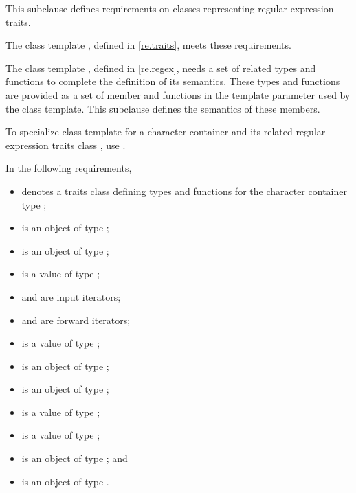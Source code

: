 \pnum
This subclause defines requirements on classes representing regular
expression traits.
\begin{note}
The class template
, defined in \ref{re.traits},
meets these requirements.
\end{note}

\pnum
The class template , defined in
\ref{re.regex}, needs a set of related types and
functions to complete the definition of its semantics. These types
and functions are provided as a set of member  and functions
in the template parameter  used by the  class
template. This subclause defines the semantics of these
members.

\pnum
To specialize class template  for a character
container  and its related regular
expression traits class , use .

\pnum
{}%
%
%
%
In the following requirements,
\begin{itemize}
\item
{} denotes a traits class defining types and functions
for the character container type ;
\item
{} is an object of type ;
\item
{} is an object of type ;
\item
{} is a value of type ;
\item
{} and  are input iterators;
\item
{} and  are forward iterators;
\item
{} is a value of type ;
\item
{} is an object of type ;
\item
{} is an object of type ;
\item
{} is a value of  type ;
\item
{} is a value of type ;
\item
{} is an object of type ; and
\item
{} is an object of type .
\end{itemize}

